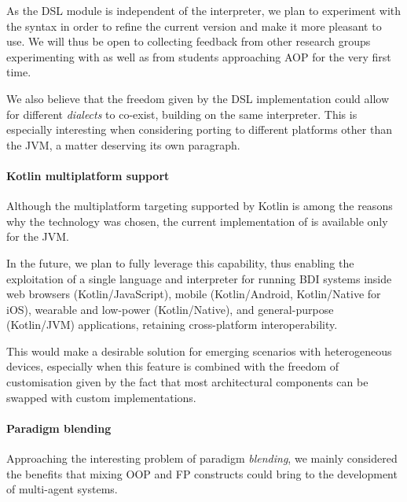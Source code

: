 As the \ac{DSL} module is independent of the interpreter,
we plan to experiment with the syntax in order to refine the current version
and make it more pleasant to use.
%
We will thus be open to collecting feedback from other research groups experimenting with \jakta{}
as well as from students approaching \ac{AOP} for the very first time.

We also believe that the freedom given by the \jakta{} \ac{DSL} implementation
could allow for different \textit{dialects} to co-exist,
building on the same interpreter.
%
This is especially interesting when considering porting \jakta{}
to different platforms other than the \ac{JVM},
a matter deserving its own paragraph.

\paragraph{Kotlin multiplatform support}

Although the multiplatform targeting supported by Kotlin
is among the reasons why the technology was chosen,
the current implementation of \jakta{} is available only for the \ac{JVM}.

In the future,
we plan to fully leverage this capability,
thus enabling the exploitation of a single language and interpreter for running \ac{BDI} systems
inside web browsers (Kotlin/JavaScript),
mobile (Kotlin/Android, Kotlin/Native for iOS),
wearable and low-power (Kotlin/Native),
and general-purpose (Kotlin/JVM) applications,
retaining cross-platform interoperability.

This would make \jakta{} a desirable solution for emerging scenarios with heterogeneous devices,
especially when this feature is combined with the freedom of customisation
given by the fact that most architectural components can be swapped with custom implementations.

\paragraph{Paradigm blending}

Approaching the interesting problem of paradigm \textit{blending},
we mainly considered the benefits that mixing \ac{OOP} and \ac{FP} constructs
could bring to the development of multi-agent systems.

